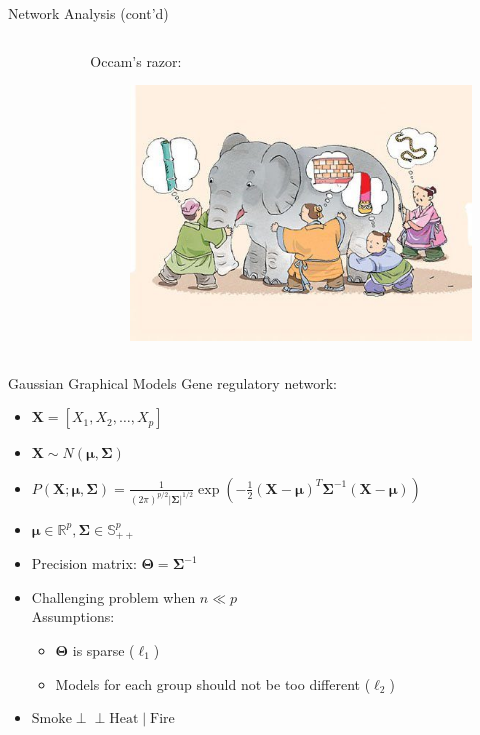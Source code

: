 \documentclass{beamer}
\def\ci{\perp\!\!\!\perp}
\begin{document}
\begin{frame}{Network Analysis (cont'd)}
\begin{columns}
\begin{column}[t]{.48\textwidth}
\begin{figure}[ht]
				\caption*{\label{fig:correlation-causation}}
			\end{figure}
		\end{column}
		\begin{column}[t]{.48\textwidth}
			Occam's razor:
			\begin{figure}[ht]
				\centering
				\includegraphics[width=1\textwidth,height=0.7\textheight]{img/elephant.jpg}
				\caption*{\label{fig:elephant}}
			\end{figure}
		\end{column}
	\end{columns}
\end{frame}
\begin{frame}{Gaussian Graphical Models}
	Gene regulatory network:
	\begin{itemize}
		\item $\bm{X}=\left[X_{1}, X_{2}, \dots, X_{p}\right]$
		\item $\bm{X} \sim N(\bm{\mu}, \bm{\Sigma})$
		\item $P(\bm{X} ; \bm{\mu}, \bm{\Sigma})=\frac{1}{(2 \pi)^{p / 2}|\bm{\Sigma}|^{1 / 2}} \exp \left(-\frac{1}{2}(\bm{X}-\bm{\mu})^{T} \bm{\Sigma}^{-1}(\bm{X}-\bm{\mu})\right)$
		\item $\bm{\mu} \in \mathbb{R}^{p}, \boldsymbol{\Sigma} \in \mathbb{S}_{++}^{p}$
		\item Precision matrix: $\bm{\Theta} = \bm{\Sigma}^{-1}$
		\item Challenging problem when $n \ll p$\\
		      Assumptions:
		      \begin{itemize}
			      \item $\bm{\Theta}$ is sparse ($\ell_{1}$)
			      \item Models for each group should not be too different ($\ell_{2}$)
		      \end{itemize}
		\item $\text{Smoke} \ci \text{Heat} \mid \text{Fire}$
	\end{itemize}
\end{frame}
\end{document}
